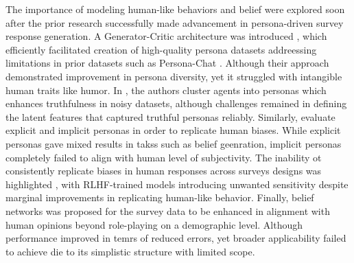 \documentclass[11pt]{article}
\begin{document}
The importance of modeling human-like behaviors and belief were explored soon after the prior research successfully made advancement in persona-driven survey response generation. A Generator-Critic architecture was introduced \citep{jandaghi-etal-2024-faithful}, which efficiently facilitated creation of high-quality persona datasets addreessing limitations in prior datasets such as Persona-Chat \citep{zhang-etal-2018-personalizing}. Although their approach demonstrated improvement in persona diversity, yet it struggled with intangible human traits like humor. In \citep{joshi2024personaswaymodeltruthfulness}, the authors cluster agents into personas which enhances truthfulness in noisy datasets, although challenges remained in defining the latent features that captured truthful personas reliably. Similarly, \citep{giorgi-etal-2024-modeling} evaluate explicit and implicit personas in order to replicate human biases. While explicit personas gave mixed results in takss such as belief geenration, implicit personas completely failed to align with human level of subjectivity. The inability ot consistently replicate biases in human responses across surveys designs was highlighted \citep{tjuatja2024llmsexhibithumanlikeresponse}, with RLHF-trained models introducing unwanted sensitivity despite marginal improvements in replicating human-like behavior. Finally, belief networks was proposed \citep{chuang2024demographicsaligningroleplayingllmbased} for the survey data to be enhanced in alignment with human opinions beyond role-playing on a demographic level. Although performance improved in temrs of reduced errors, yet broader applicability failed to achieve die to its simplistic structure with limited scope.
\end{document}
